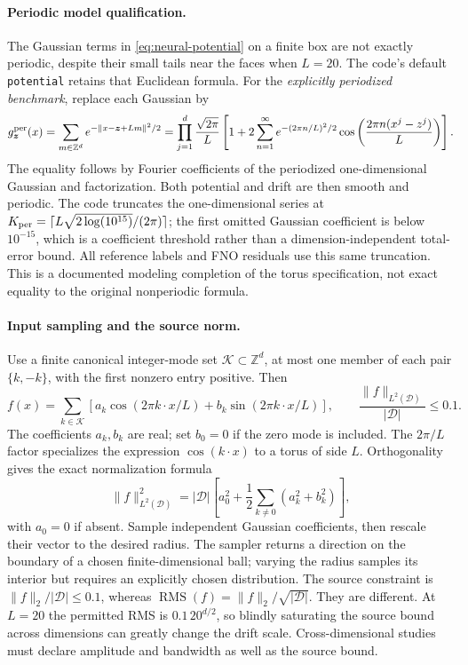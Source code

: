 \documentclass[12pt,a4paper,oneside]{book}
\begin{document}
\paragraph{Periodic model qualification.}
The Gaussian terms in \eqref{eq:neural-potential} on a finite box are not exactly periodic, despite their small tails
near the faces when $L=20$. The code's default \texttt{potential} retains that Euclidean formula.
For the \emph{explicitly periodized benchmark}, replace each Gaussian by
\begin{equation*}
 g_{\boldsymbol z}^{\rm per}(x)
 =\sum_{m\in\mathbb Z^d}e^{-\|x-\boldsymbol z+Lm\|^2/2}
 =\prod_{j=1}^d\frac{\sqrt{2\pi}}{L}
 \left[1+2\sum_{n=1}^\infty e^{-(2\pi n/L)^2/2}
 \cos\left(\frac{2\pi n(x^j-z^j)}{L}\right)\right].
\end{equation*}
The equality follows by Fourier coefficients of the periodized one-dimensional Gaussian and factorization.
Both potential and drift are then smooth and periodic. The code truncates the one-dimensional series at
$K_{\rm per}=\lceil L\sqrt{2\log(10^{15})}/(2\pi)\rceil$; the first omitted Gaussian coefficient is below
$10^{-15}$, which is a coefficient threshold rather than a dimension-independent total-error bound.
All reference labels and FNO residuals use this same truncation. This is a documented modeling completion of the
torus specification, not exact equality to the original nonperiodic formula.

\paragraph{Input sampling and the source norm.}
Use a finite canonical integer-mode set $\mathcal K\subset\mathbb Z^d$, at most one member of each pair $\{k,-k\}$,
with the first nonzero entry positive. Then
\begin{equation}
 f(x)=\sum_{k\in\mathcal K}\left[a_k\cos(2\pi k\cdot x/L)+b_k\sin(2\pi k\cdot x/L)\right],
 \qquad \frac{\|f\|_{L^2(\mathcal D)}}{|\mathcal D|}\le0.1.
 \label{eq:neural-fourier}
\end{equation}
The coefficients $a_k,b_k$ are real; set $b_0=0$ if the zero mode is included.
The $2\pi/L$ factor specializes the expression $\cos(k\cdot x)$ to a torus of side $L$.
Orthogonality gives the exact normalization formula
\begin{equation*}
 \|f\|_{L^2(\mathcal D)}^2
 =|\mathcal D|\left[a_0^2+\frac12\sum_{k\ne0}(a_k^2+b_k^2)\right],
\end{equation*}
with $a_0=0$ if absent. Sample independent Gaussian coefficients, then rescale their vector to the desired radius.
The sampler returns a direction on the boundary of a chosen finite-dimensional ball; varying the radius samples its
interior but requires an explicitly chosen distribution. The source constraint is
$\|f\|_2/|\mathcal D|\le0.1$, whereas
$\operatorname{RMS}(f)=\|f\|_2/\sqrt{|\mathcal D|}$. They are different.
At $L=20$ the permitted RMS is $0.1\,20^{d/2}$, so blindly saturating the source bound across dimensions can greatly
change the drift scale. Cross-dimensional studies must declare amplitude and bandwidth as well as the source bound.
\end{document}
